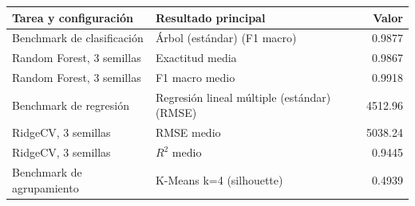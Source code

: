 \begin{tabular}{llr}
\toprule
Tarea y configuración & Resultado principal & Valor \\
\midrule
Benchmark de clasificación & Árbol (estándar) (F1 macro) & 0.9877 \\
Random Forest, 3 semillas & Exactitud media & 0.9867 \\
Random Forest, 3 semillas & F1 macro medio & 0.9918 \\
Benchmark de regresión & Regresión lineal múltiple (estándar) (RMSE) & 4512.96 \\
RidgeCV, 3 semillas & RMSE medio & 5038.24 \\
RidgeCV, 3 semillas & $R^2$ medio & 0.9445 \\
Benchmark de agrupamiento & K-Means k=4 (silhouette) & 0.4939 \\
\bottomrule
\end{tabular}
